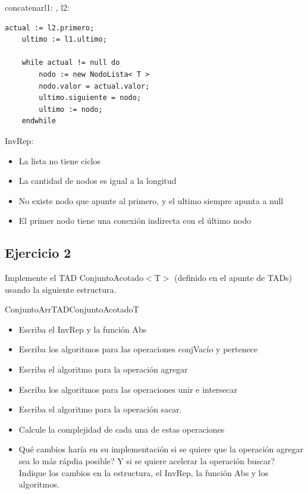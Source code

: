 {\begin{proc}{concatenar}{\Inout l1: \moduletype, \In l2: \moduletype}{}
\begin{lstlisting}[numbers=none,frame=none]
	actual := l2.primero;
	ultimo := l1.ultimo;

	while actual != null do
		nodo := new NodoLista< T >
		nodo.valor = actual.valor;
		ultimo.siguiente = nodo;
		ultimo := nodo;
	endwhile
	\end{lstlisting}
\end{proc}

InvRep:
\begin{itemize}
	\item La lista no tiene ciclos
	\item La cantidad de nodos es igual a la longitud
	\item No existe nodo que apunte al primero, y el ultimo siempre apunta a null
	\item El primer nodo tiene una conexión indirecta con el último nodo
\end{itemize}

}

\subsection{Ejercicio 2}
Implemente el TAD ConjuntoAcotado$<$T$>$ (definido en el apunte de TADs) usando la siguiente estructura.

\begin{module}{ConjuntoArr}{TAD}{ConjuntoAcotado}{T}
\end{module}

\begin{itemize}
	\item Escriba el InvRep y la función Abs
	\item Escriba los algoritmos para las operaciones conjVacío y pertenece
	\item Escriba el algoritmo para la operación agregar
	\item Escriba los algoritmos para las operaciones unir e intersecar
	\item Escriba el algoritmo para la operación sacar.
	\item Calcule la complejidad de cada una de estas operaciones
	\item Qué cambios haría en su implementación si se quiere que la operación agregar sea lo más rápdia posible? Y si se quiere acelerar la operación buscar? Indique los cambios en la estructura, el InvRep, la función Abs y los algoritmos.
\end{itemize}

